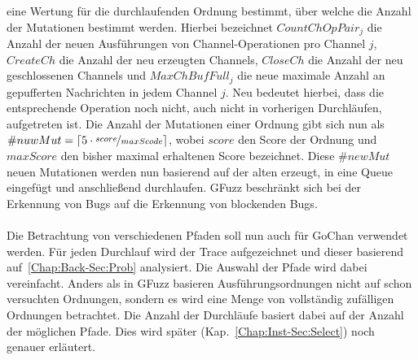 eine Wertung für die durchlaufenden Ordnung bestimmt, über welche die 
Anzahl der Mutationen bestimmt werden. Hierbei bezeichnet $CountChOpPair_j$ 
die Anzahl der neuen Ausführungen von Channel-Operationen pro Channel $j$, $CreateCh$
die Anzahl der neu erzeugten Channels, $CloseCh$ die Anzahl der neu geschlossenen 
Channels und $MaxChBufFull_j$ die neue maximale Anzahl an 
gepufferten Nachrichten in jedem Channel $j$. Neu bedeutet hierbei, dass die
entsprechende Operation noch nicht, auch nicht in vorherigen Durchläufen, 
aufgetreten ist. Die Anzahl der Mutationen 
einer Ordnung gibt sich nun als $\# nuwMut = \lceil 5 \cdot \nicefrac{score}{maxScode} \rceil$, 
wobei $score$ den Score der Ordnung und $maxScore$ den bisher maximal 
erhaltenen Score bezeichnet. Diese $\# newMut$ neuen Mutationen werden nun 
basierend auf der alten erzeugt, in eine Queue eingefügt und anschließend 
durchlaufen. GFuzz beschränkt sich bei der Erkennung von Bugs auf die Erkennung
von blockenden Bugs.\\\\
Die Betrachtung von verschiedenen Pfaden soll nun auch für GoChan 
 verwendet werden. Für jeden Durchlauf wird 
der Trace aufgezeichnet und dieser basierend 
auf~\ref{Chap:Back-Sec:Prob}
analysiert. Die Auswahl der Pfade wird dabei vereinfacht. Anders als 
in GFuzz basieren Ausführungsordnungen nicht auf schon versuchten Ordnungen, 
sondern es wird eine Menge von vollständig zufälligen Ordnungen betrachtet. 
Die Anzahl der Durchläufe basiert dabei auf der Anzahl der möglichen Pfade.
Dies wird später (Kap.~\ref{Chap:Inst-Sec:Select}) noch genauer erläutert. 